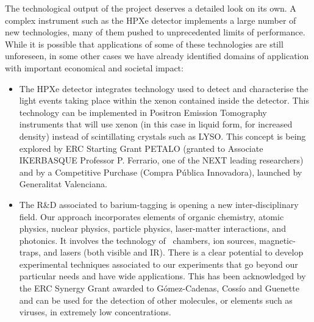 The technological output of the project deserves a detailed look on its own. A complex instrument such as the HPXe detector implements a large number of new technologies, many of them pushed to unprecedented limits of performance. While it is possible that applications of some of these technologies are still unforeseen, in some other cases we have already identified domains of application with important economical and societal impact: 

\begin{itemize}[noitemsep,topsep=0pt,parsep=0pt,partopsep=0pt]
\item The HPXe detector integrates technology used to detect and characterise the light events taking place within the xenon contained inside the detector. This technology can be implemented in Positron Emission Tomography instruments that will use xenon (in this case in liquid form, for increased density) instead of scintillating crystals such as LYSO.  This concept is being explored by ERC Starting Grant PETALO (granted to Associate IKERBASQUE Professor P. Ferrario, one of the NEXT leading researchers) and by a Competitive Purchase (Compra P\'ublica Innovadora), launched by Generalitat Valenciana.

\item The R\&D associated to barium-tagging is opening a new inter-disciplinary field. Our approach incorporates elements of organic chemistry, atomic physics, nuclear physics, particle physics, laser-matter interactions, and photonics. It involves the technology of \HPXeEL\ chambers, ion sources, magnetic-traps, and lasers (both visible and IR). There is a clear potential to develop experimental techniques associated to our experiments that go beyond our particular needs and have wide applications. This has been acknowledged by the ERC Synergy Grant awarded to G\'omez-Cadenas, Coss\'io and Guenette and can be used for the detection of other molecules, or elements such as viruses, in extremely low concentrations. 
\end{itemize}
